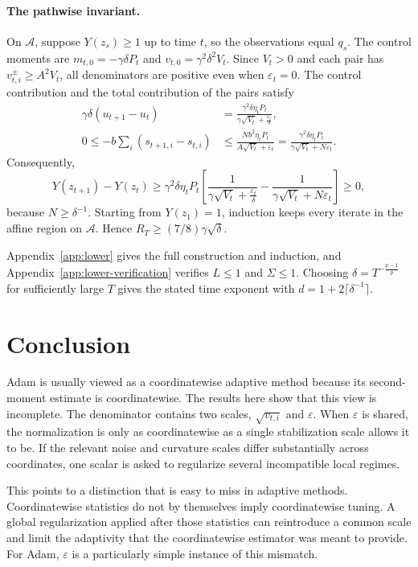 \documentclass[11pt,letterpaper]{article}
\theoremstyle{definition}
\newcommand{\eps}{\varepsilon}
\begin{document}
\paragraph{The pathwise invariant.}
On $\mathcal A$, suppose $Y(z_s)\ge1$ up to time $t$, so the observations equal $q_s$. The control moments are $m_{t,0}=-\gamma\delta P_t$ and $v_{t,0}=\gamma^2\delta^2V_t$. Since $V_t>0$ and each pair has $v_{t,i}^{\pm}\ge A^2V_t$, all denominators are positive even when $\eps_t=0$. The control contribution and the total contribution of the pairs satisfy
\begin{align*}
\gamma\delta(u_{t+1}-u_t)
&=\frac{\gamma^2\delta\eta_tP_t}{\gamma\sqrt{V_t}+\frac{\eps_t}{\delta}},\\
0\le-b\sum_i(s_{t+1,i}-s_{t,i})
&\le\frac{Nb^2\eta_tP_t}{A\sqrt{V_t}+\eps_t}
=\frac{\gamma^2\delta\eta_tP_t}{\gamma\sqrt{V_t}+N\eps_t}.
\end{align*}
Consequently,
\begin{equation}
Y(z_{t+1})-Y(z_t)
\ge\gamma^2\delta\eta_tP_t
\left[\frac1{\gamma\sqrt{V_t}+\frac{\eps_t}{\delta}}
-\frac1{\gamma\sqrt{V_t}+N\eps_t}\right]\ge0,
\label{eq:main-monotonicity}
\end{equation}
because $N\ge\delta^{-1}$. Starting from $Y(z_1)=1$, induction keeps every iterate in the affine region on $\mathcal A$. Hence $R_T\ge(7/8)\gamma\sqrt\delta$.

Appendix~\ref{app:lower} gives the full construction and induction,
and Appendix~\ref{app:lower-verification} verifies $L\le1$ and $\Sigma\le1$.
Choosing $\delta=T^{-\frac{p-1}{p}}$ for sufficiently large $T$
gives the stated time exponent with $d=1+2\lceil\delta^{-1}\rceil$.


\section{Conclusion}

Adam is usually viewed as a coordinatewise adaptive method because its second-moment estimate is coordinatewise. The results here show that this view is incomplete. The denominator contains two scales, $\sqrt{v_{t,i}}$ and $\eps$. When $\eps$ is shared, the normalization is only as coordinatewise as a single stabilization scale allows it to be. If the relevant noise and curvature scales differ substantially across coordinates, one scalar is asked to regularize several incompatible local regimes.

This points to a distinction that is easy to miss in adaptive methods. Coordinatewise statistics do not by themselves imply coordinatewise tuning. A global regularization applied after those statistics can reintroduce a common scale and limit the adaptivity that the coordinatewise estimator was meant to provide. For Adam, $\eps$ is a particularly simple instance of this mismatch. 
\end{document}
